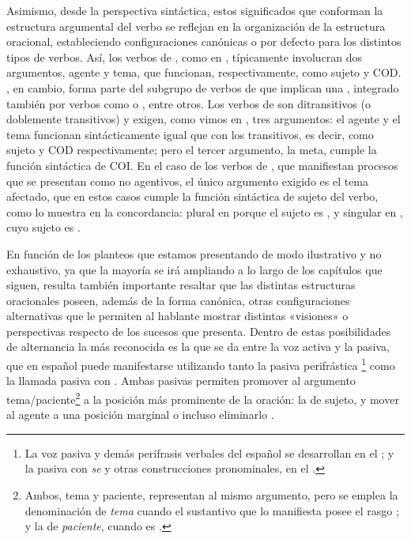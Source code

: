 Asimismo, desde la perspectiva sintáctica, estos significados que conforman la
estructura argumental del verbo se reflejan en la organización de la estructura
oracional, estableciendo configuraciones canónicas o por defecto para los
distintos tipos de verbos. Así, los verbos de , como 
en , típicamente involucran dos argumentos, agente y
tema, que funcionan, respectivamente, como sujeto y COD. , en
cambio, forma parte del subgrupo de verbos de  que implican una
, integrado también por verbos como  o , entre otros. Los verbos de  son
ditransitivos (o doblemente transitivos) y exigen, como vimos en
, tres argumentos: el agente y el tema funcionan
sintácticamente igual que con los transitivos, es decir, como sujeto y COD
respectivamente; pero el tercer argumento, la meta, cumple la función
sintáctica de COI. En el caso de los verbos de , que
manifiestan procesos que se presentan como no agentivos, el único argumento
exigido es el tema afectado, que en estos casos cumple la función sintáctica de
sujeto del verbo, como lo muestra en  la
concordancia: plural en  porque el sujeto es , y singular en , cuyo sujeto es .

En función de los planteos que estamos presentando de modo ilustrativo y no
exhaustivo, ya que la mayoría se irá ampliando a lo largo de los capítulos que
siguen, resulta también importante resaltar que las distintas estructuras
oracionales poseen, además de la forma canónica, otras configuraciones
alternativas que le permiten al hablante mostrar distintas «visiones» o
perspectivas respecto de los sucesos que presenta. Dentro de estas
posibilidades de alternancia la más reconocida es la que se da entre la voz
activa y la pasiva, que en español puede manifestarse utilizando tanto la
pasiva perifrástica \footnote{La voz pasiva y demás
perífrasis verbales del español se desarrollan en el ; y la pasiva
con \textit{se} y otras construcciones pronominales, en el .} como
la llamada pasiva con  . Ambas pasivas
permiten promover al argumento tema/paciente\footnote{Ambos, tema y paciente,
representan al mismo argumento, pero se emplea la denominación de
\textit{tema} cuando el sustantivo que lo manifiesta posee el rasgo ; y la de \textit{paciente}, cuando es .} a la posición
más prominente de la oración: la de sujeto, y mover al agente a una posición
marginal  o incluso eliminarlo
.

